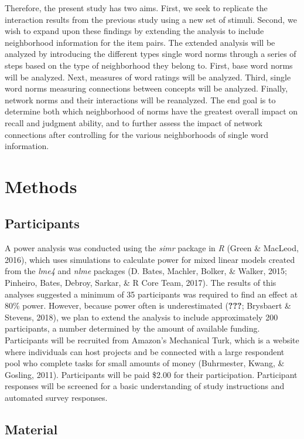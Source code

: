 \documentclass[english,man]{apa6}
\theoremstyle{definition}
\theoremstyle{definition}
\theoremstyle{definition}
\theoremstyle{remark}
\begin{document}
Therefore, the present study has two aims. First, we seek to replicate
the interaction results from the previous study using a new set of
stimuli. Second, we wish to expand upon these findings by extending the
analysis to include neighborhood information for the item pairs. The
extended analysis will be analyzed by introducing the different types
single word norms through a series of steps based on the type of
neighborhood they belong to. First, base word norms will be analyzed.
Next, measures of word ratings will be analyzed. Third, single word
norms measuring connections between concepts will be analyzed. Finally,
network norms and their interactions will be reanalyzed. The end goal is
to determine both which neighborhood of norms have the greatest overall
impact on recall and judgment ability, and to further assess the impact
of network connections after controlling for the various neighborhoods
of single word information.

\section{Methods}\label{methods}

\subsection{Participants}\label{participants}

A power analysis was conducted using the \emph{simr} package in \emph{R}
(Green \& MacLeod, 2016), which uses simulations to calculate power for
mixed linear models created from the \emph{lme4} and \emph{nlme}
packages (D. Bates, Machler, Bolker, \& Walker, 2015; Pinheiro, Bates,
Debroy, Sarkar, \& R Core Team, 2017). The results of this analyses
suggested a minimum of 35 participants was required to find an effect at
80\% power. However, because power often is underestimated
({\textbf{???}}; Brysbaert \& Stevens, 2018), we plan to extend the
analysis to include approximately 200 participants, a number determined
by the amount of available funding. Participants will be recruited from
Amazon's Mechanical Turk, which is a website where individuals can host
projects and be connected with a large respondent pool who complete
tasks for small amounts of money (Buhrmester, Kwang, \& Gosling, 2011).
Participants will be paid \$2.00 for their participation. Participant
responses will be screened for a basic understanding of study
instructions and automated survey responses.

\subsection{Material}\label{material}
\end{document}
